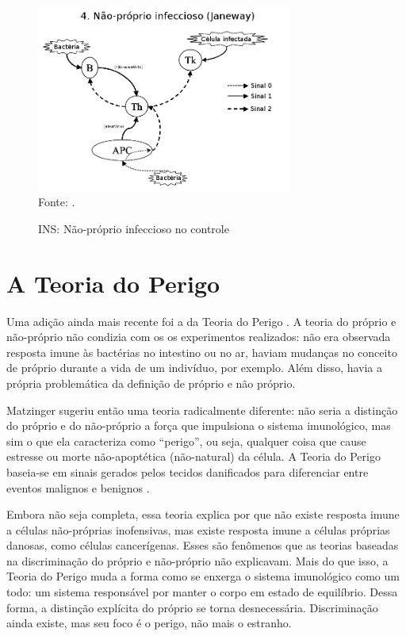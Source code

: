 \begin{figure}[h!]
    \vspace{0.5cm}
    \centering
    \caption{INS: Não-próprio infeccioso no controle}
    \label{fig:nis_nsinf}
    \label{fig:signals_last}
    \vspace{0.5cm}
    \includegraphics[width=0.75\textwidth]{img/signals4-ins_br.png}
    \vspace{0.5cm}
    \\ Fonte: \citet{Aickelin2002}.
    \vspace{0.5cm}
\end{figure}

\section{A Teoria do Perigo}

Uma adição ainda mais recente foi a da Teoria do Perigo \cite{Matzinger1994}. A teoria do próprio e não-próprio não condizia com os os experimentos realizados: não era observada resposta imune às bactérias no intestino ou no ar, haviam mudanças no conceito de próprio durante a vida de um indivíduo, por exemplo. Além disso, havia a própria problemática da definição de próprio e não próprio.

Matzinger sugeriu então uma teoria radicalmente diferente: não seria a distinção do próprio e do não-próprio a força que impulsiona o sistema imunológico, mas sim o que ela caracteriza como ``perigo'', ou seja, qualquer coisa que cause estresse ou morte não-apoptética (não-natural) da célula. A Teoria do Perigo baseia-se em sinais gerados pelos tecidos danificados para diferenciar entre eventos malignos e benignos \cite{Cayzer2007}.

Embora não seja completa, essa teoria explica por que não existe resposta imune a células não-próprias inofensivas, mas existe resposta imune a células próprias danosas, como células cancerígenas. Esses são fenômenos que as teorias baseadas na discriminação do próprio e não-próprio não explicavam. Mais do que isso, a Teoria do Perigo muda a forma como se enxerga o sistema imunológico como um todo: um sistema responsável por manter o corpo em estado de equilíbrio. Dessa forma, a distinção explícita do próprio se torna desnecessária. Discriminação ainda existe, mas seu foco é o perigo, não mais o estranho.

